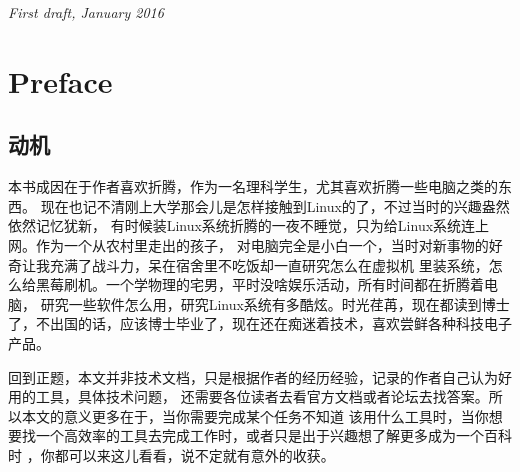 \documentclass[11pt,fleqn]{book} %
\begin{document}
\noindent \textit{First draft, January 2016} %



\pagestyle{empty} %

\tableofcontents %

\cleardoublepage %

\pagestyle{fancy} %



\chapter{Preface}

\section{动机}
本书成因在于作者喜欢折腾，作为一名理科学生，尤其喜欢折腾一些电脑之类的东西。
现在也记不清刚上大学那会儿是怎样接触到Linux的了，不过当时的兴趣盎然依然记忆犹新，
有时候装Linux系统折腾的一夜不睡觉，只为给Linux系统连上网。作为一个从农村里走出的孩子，
对电脑完全是小白一个，当时对新事物的好奇让我充满了战斗力，呆在宿舍里不吃饭却一直研究怎么在虚拟机
里装系统，怎么给黑莓刷机。一个学物理的宅男，平时没啥娱乐活动，所有时间都在折腾着电脑，
研究一些软件怎么用，研究Linux系统有多酷炫。时光荏苒，现在都读到博士了，不出国的话，应该博士毕业了，现在还在痴迷着技术，喜欢尝鲜各种科技电子产品。

回到正题，本文并非技术文档，只是根据作者的经历经验，记录的作者自己认为好用的工具，具体技术问题，
还需要各位读者去看官方文档或者论坛去找答案。所以本文的意义更多在于，当你需要完成某个任务不知道
该用什么工具时，当你想要找一个高效率的工具去完成工作时，或者只是出于兴趣想了解更多成为一个百科时
，你都可以来这儿看看，说不定就有意外的收获。
\end{document}

